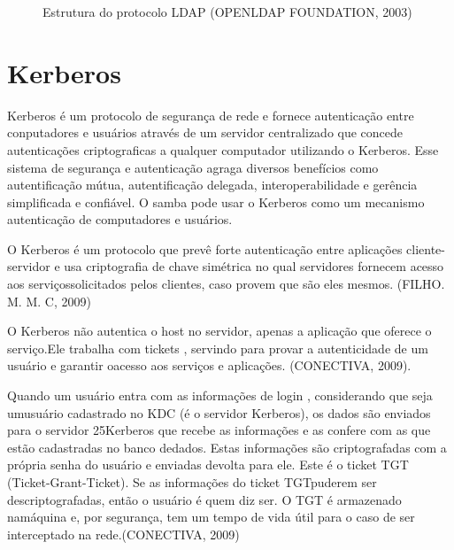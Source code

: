 \begin{figure}[ht]
   	\centering
   	\caption{Estrutura do protocolo LDAP (OPENLDAP FOUNDATION, 2003)}
    \label{ldap}
\end{figure}

\section{Kerberos}

Kerberos é um protocolo de segurança de rede e fornece autenticação entre conputadores e usuários através de um servidor centralizado que concede autenticações criptograficas a qualquer computador utilizando o Kerberos. Esse sistema de segurança e autenticação agraga diversos benefícios como autentificação mútua, autentificação delegada, interoperabilidade e gerência simplificada e confiável. O samba pode usar o Kerberos como um mecanismo autenticação de computadores e usuários.

O Kerberos é um protocolo que prevê forte autenticação entre aplicações cliente-servidor e usa criptografia de chave simétrica no qual servidores fornecem acesso aos serviçossolicitados pelos clientes, caso provem que são eles mesmos. (FILHO. M. M. C, 2009)

O Kerberos não autentica o host no servidor, apenas a aplicação que oferece o serviço.Ele trabalha com tickets , servindo para provar a autenticidade de um usuário e garantir oacesso aos serviços e aplicações. (CONECTIVA, 2009).

Quando um usuário entra com as informações de login , considerando que seja umusuário cadastrado no KDC (é o servidor Kerberos), os dados são enviados para o servidor 25Kerberos que recebe as informações e as confere com as que estão cadastradas no banco dedados. Estas informações são criptografadas com a própria senha do usuário e enviadas devolta para ele. Este é o ticket TGT (Ticket-Grant-Ticket). Se as informações do ticket TGTpuderem ser descriptografadas, então o usuário é quem diz ser. O TGT é armazenado namáquina e, por segurança, tem um tempo de vida útil para o caso de ser interceptado na rede.(CONECTIVA, 2009)

